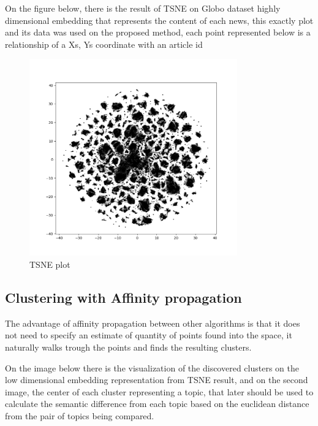 \documentclass[ecp,tc,english]{iiufrgs}
\begin{document}
        On the figure below, there is the result of TSNE on Globo dataset highly dimensional embedding that represents the content of each news, this exactly plot and its data was used on the proposed method, each point represented below is a relationship of a Xs, Ys coordinate with an article id 
        \par
            \begin{figure}
                \centering
                \includegraphics[width=0.8\textwidth]{images/tsne_clusters.png}
                \caption{TSNE plot}
                \label{fig:tsne_plot}
            \end{figure}
        
        \subsection{Clustering with Affinity propagation}

        The advantage of affinity propagation between other algorithms is that it does not need to specify an estimate of quantity of points found into the space, it naturally walks trough the points and finds the resulting clusters.

        On the image below there is the visualization of the discovered clusters on the low dimensional embedding representation from TSNE result, and on the second image, the center of each cluster representing a topic, that later should be used to calculate the semantic difference from each topic based on the euclidean distance from the pair of topics being compared.
         
\end{document}
